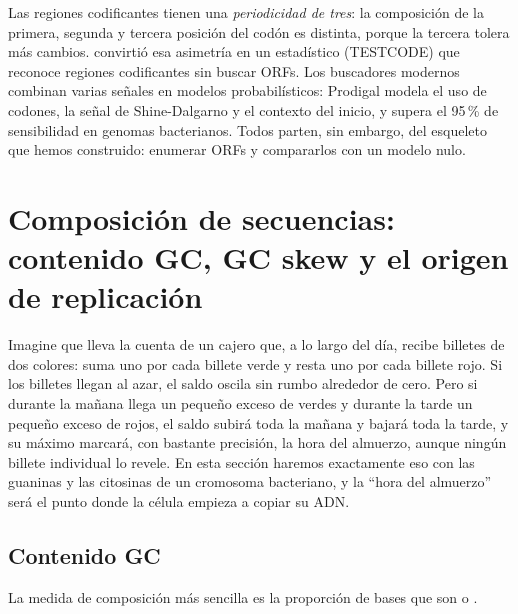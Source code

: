 \begin{profundizacion}
Las regiones codificantes tienen una \emph{periodicidad de tres}: la composición de la primera, segunda y tercera posición del codón es distinta, porque la tercera tolera más cambios. \textcite{c01-fickett1982} convirtió esa asimetría en un estadístico (TESTCODE) que reconoce regiones codificantes sin buscar ORFs. Los buscadores modernos combinan varias señales en modelos probabilísticos: Prodigal \parencite{c01-hyatt2010} modela el uso de codones, la señal de Shine-Dalgarno y el contexto del inicio, y supera el 95\,\% de sensibilidad en genomas bacterianos. Todos parten, sin embargo, del esqueleto que hemos construido: enumerar ORFs y compararlos con un modelo nulo.
\end{profundizacion}


\section{Composición de secuencias: contenido GC, GC skew y el origen de replicación}\label{sec:01-gcskew}

\begin{intuicion}
Imagine que lleva la cuenta de un cajero que, a lo largo del día, recibe billetes de dos colores: suma uno por cada billete verde y resta uno por cada billete rojo. Si los billetes llegan al azar, el saldo oscila sin rumbo alrededor de cero. Pero si durante la mañana llega un pequeño exceso de verdes y durante la tarde un pequeño exceso de rojos, el saldo subirá toda la mañana y bajará toda la tarde, y su máximo marcará, con bastante precisión, la hora del almuerzo, aunque ningún billete individual lo revele. En esta sección haremos exactamente eso con las guaninas y las citosinas de un cromosoma bacteriano, y la ``hora del almuerzo'' será el punto donde la célula empieza a copiar su ADN.
\end{intuicion}

\subsection{Contenido GC}

La medida de composición más sencilla es la proporción de bases que son  o .

